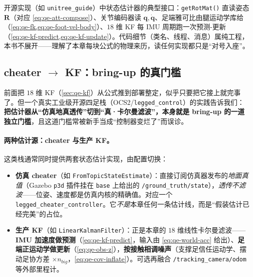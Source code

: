 \begin{practice}
开源实现（如 \texttt{unitree\_guide}）中状态估计器的典型接口：\texttt{getRotMat()} 直读姿态 $\mathbf{R}$（对应 \cref{eq:qe-att-compose}）、关节编码器读 $\boldsymbol q,\dot{\boldsymbol q}$、足端雅可比由腿运动学库给（\cref{eq:qe-fk,eq:qe-foot-vel-body}）、$18$ 维 KF 每 IMU 周期跑一次预测-更新（\cref{eq:qe-kf-predict,eq:qe-kf-update}）。代码细节（类名、线程、消息）属纯工程，本书不展开——理解了本章每块公式的物理来历，读任何实现都只是“对号入座”。
\end{practice}

\subsection{cheater \texorpdfstring{$\to$}{->} KF：bring-up 的真门槛}
\label{subsec:qe-cheater-gate}

前面把 $18$ 维 KF（\cref{sec:qe-kf}）从公式推到部署整定，似乎只要把它接上就完事了。但一个真实工业级开源四足栈（OCS2/\texttt{legged\_control}\cite{flayols2017experimental}）的实践告诉我们：\textbf{把估计器从“仿真地真透传”切到“真·卡尔曼滤波”，本身就是 bring-up 的一道独立门槛}，且这道门槛常被新手当成“控制器变烂了”而误诊。

\paragraph{两种估计源：cheater 与生产 KF。}
这类栈通常同时提供两套状态估计实现，由配置切换：
\begin{itemize}
  \item \textbf{仿真 cheater}（如 \texttt{FromTopicStateEstimate}）：直接订阅仿真器发布的\emph{地面真值}（Gazebo \texttt{p3d} 插件挂在 \texttt{base} 上给出的 \texttt{/ground\_truth/state}），\emph{透传不滤波}——位姿、速度都是仿真内核的精确值。对应一个 \texttt{legged\_cheater\_controller}。它\emph{不是}本章任何一条估计线，而是“假装估计已经完美”的占位。
  \item \textbf{生产 KF}（如 \texttt{LinearKalmanFilter}）：正是本章的 $18$ 维线性卡尔曼滤波——\textbf{IMU 加速度做预测}（\cref{eq:qe-kf-predict}，输入由 \cref{eq:qe-world-acc} 给出）、\textbf{足端正运动学做更新}（\cref{eq:qe-obs-z}），\textbf{按接触相调噪声}（支撑足信任运动学、摆动足协方差 $\times n_{big}$，\cref{eq:qe-cov-inflate}）。可选再融合 \texttt{/tracking\_camera/odom} 等外部里程计。
\end{itemize}


